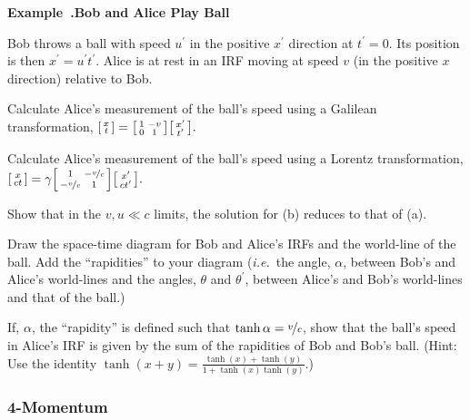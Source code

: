 \documentclass[12pt,oneside]{book}
\newcounter{example}[chapter]
\newenvironment{example}[2]{\noindent\refstepcounter{example}\par\medskip
	\noindent\textbf{Example~\thechapter.\theexample\quad #1} 
	\par\medskip\noindent#2
	\rmfamily}{\medskip}
\newcommand{\ie}{\textit{i.e.}\ }
\begin{document}
\begin{example}{Bob and Alice Play Ball}{%
Bob throws a ball with speed $u^\prime$ in the positive $x^\prime$ direction at $t^\prime=0$. Its position is then $x^\prime=u^\prime t^\prime$. Alice is at rest in an IRF moving at speed $v$ (in the positive $x$ direction) relative to Bob.}%
\begin{inparaenum}[(a)]
\item
Calculate Alice's measurement of the ball's speed using a Galilean transformation,
$
\smqty[x\\t]
=
\smqty[
1 & -v
\\
0 & 1
]
\smqty[
x^\prime
\\
t^\prime
].
$
\item
Calculate Alice's measurement of the ball's speed using a Lorentz transformation,
$
\smqty[x\\ct]
=
\gamma
\smqty[
1 & -\nicefrac{v}{c}
\\
-\nicefrac{v}{c} & 1
]
\smqty[
x^\prime
\\
ct^\prime
].
$
\item
Show that in the $v,u\ll c$ limits, the solution for (b) reduces to that of (a).
\item
Draw the space-time diagram for Bob and Alice's IRFs and the world-line of the ball. Add the ``rapidities'' to your diagram (\ie the angle, $\alpha$, between Bob's and Alice's world-lines and the angles, $\theta$ and $\theta^\prime$, between Alice's and Bob's world-lines and that of the ball.)

\item
If, $\alpha$, the ``rapidity'' is defined such that $\tanh\alpha=\nicefrac{v}{c}$, show that the ball's speed in Alice's IRF is given by the sum of the rapidities of Bob and Bob's ball. (Hint: Use the identity 
$  \tanh(x + y) = \frac{\tanh (x) + \tanh (y)}{1 + \tanh (x) \tanh (y)}$.)
\end{inparaenum}
\end{example}

\subsubsection{4-Momentum}
\end{document}
